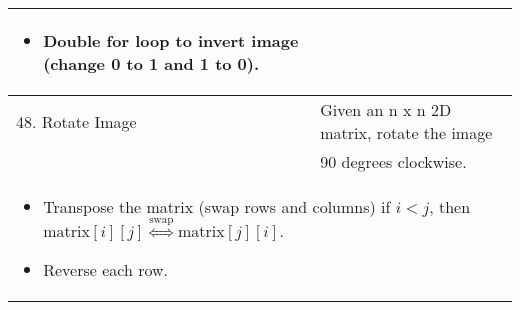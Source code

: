 \begin{summary}
\begin{center}
\begin{tabular}{ll}
{\begin{itemize}
                    \item Double for loop to invert image (change 0 to 1 and 1 to 0).
                \end{itemize}
            } \\
            \midrule
            48. Rotate Image & Given an n x n 2D matrix, rotate the image \\
            & 90 degrees clockwise. \\
            \multicolumn{2}{p{\linewidth}}{
                \begin{itemize}
                    \item Transpose the matrix (swap rows and columns) if $i<j$, then $\text{matrix}[i][j] \overset{\text{swap}}{\iff} \text{matrix}[j][i]$.
                    \item Reverse each row.
                \end{itemize}
            } \\
        \end{tabular}
    \end{center}
\end{summary}
